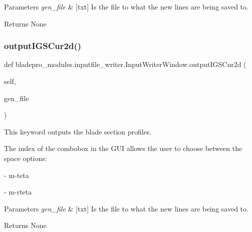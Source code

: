 \begin{DoxyParams}{Parameters}
{\em gen\+\_\+file} & \mbox{[}txt\mbox{]} Is the file to what the new lines are being saved to. \\
\hline
\end{DoxyParams}
\begin{DoxyReturn}{Returns}
None 
\end{DoxyReturn}
\hypertarget{a00071_ace84b07ce1416a3535068da6baa2e7d3}{}\label{a00071_ace84b07ce1416a3535068da6baa2e7d3} 
\subsubsection{\texorpdfstring{output\+I\+G\+S\+Cur2d()}{outputIGSCur2d()}}
{\footnotesize\ttfamily def bladepro\+\_\+modules.\+inputfile\+\_\+writer.\+Input\+Writer\+Window.\+output\+I\+G\+S\+Cur2d (\begin{DoxyParamCaption}\item[{}]{self,  }\item[{}]{gen\+\_\+file }\end{DoxyParamCaption})}



This keyword outputs the blade section profiles. 

The index of the combobox in the G\+UI allows the user to choose between the space options\+:

\begin{DoxyItemize}
\item {} -\/ m\textquotesingle{}-\/teta \item {} -\/ m-\/rteta\end{DoxyItemize}

\begin{DoxyParams}{Parameters}
{\em gen\+\_\+file} & \mbox{[}txt\mbox{]} Is the file to what the new lines are being saved to. \\
\hline
\end{DoxyParams}
\begin{DoxyReturn}{Returns}
None 
\end{DoxyReturn}
\hypertarget{a00071_a394d61e8d66fde036f84746086d6c687}{}\label{a00071_a394d61e8d66fde036f84746086d6c687} 
